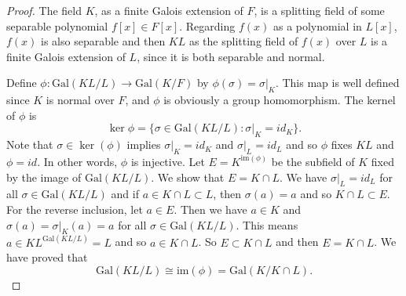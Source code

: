 \documentclass[12pt]{report}
\theoremstyle{definition}
\newcommand{\gal}{\text{Gal}}
\newcommand{\im}{\text{im}}
\begin{document}
\begin{proof}
	The field $K$, as a finite Galois extension of $F$, is a splitting field of some separable polynomial $f[x]\in F[x]$. Regarding $f(x)$ as a polynomial in $L[x]$, $f(x)$ is also separable and then $KL$ as the splitting field of $f(x)$ over $L$ is a finite Galois extension of $L$, since it is both separable and normal.

	Define $\phi: \gal(KL/L)\to \gal(K/F)$ by $\phi(\sigma)=\sigma|_K$. This map is well defined since $K$ is normal over $F$, and $\phi$ is obviously a group homomorphism. The kernel of $\phi$ is $$\ker \phi = \{\sigma\in \gal(KL/L): \sigma|_K=id_K\}.$$
	Note that $\sigma\in \ker(\phi)$ implies $\sigma|_K=id_K$ and $\sigma|_L=id_L$ and so $\phi$ fixes $KL$ and $\phi=id$. In other words, $\phi$ is injective. Let $E=K^{\im(\phi)}$ be the subfield of $K$ fixed by the image of $\gal(KL/L)$. We show that $E=K\cap L$. We have $\sigma|_L=id_L$ for all $\sigma\in \gal(KL/L)$ and if $a\in K\cap L \subset L$, then $\sigma(a)=a$ and so $K\cap L\subset E$. For the reverse inclusion, let $a\in E$. Then we have $a\in K$ and $\sigma(a)=\sigma|_K(a)=a$ for all $\sigma\in \gal(KL/L)$. This means $a\in KL^{\gal(KL/L)}=L$ and so $a\in K\cap L$. So $E\subset K\cap L$ and then $E=K\cap L$. We have proved that \[\gal(KL/L)\cong \im(\phi) =\gal(K/K\cap L).\]
\end{proof}
\end{document}

